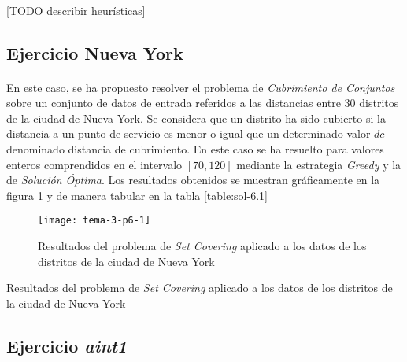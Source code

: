 \documentclass[spanish]{article}
\begin{document}
		\paragraph{}
		[TODO describir heurísticas]

		\subsection{Ejercicio Nueva York}
		\label{sec:e-6.1}

			\paragraph{}
			En este caso, se ha propuesto resolver el problema de \emph{Cubrimiento de Conjuntos} sobre un conjunto de datos de entrada referidos a las distancias entre $30$ distritos de la ciudad de Nueva York. Se considera que un distrito ha sido cubierto si la distancia a un punto de servicio es menor o igual que un determinado valor $dc$ denominado distancia de cubrimiento. En este caso se ha resuelto para valores enteros comprendidos en el intervalo $[70, 120]$ mediante la estrategia \emph{Greedy} y la de \emph{Solución Óptima}. Los resultados obtenidos se muestran gráficamente en la figura \ref{fig:sol-6.1} y de manera tabular en la tabla \ref{table:sol-6.1}


			\begin{figure}[h]
				\begin{center}
					\texttt{[image: tema-3-p6-1]}
				\end{center}
				\caption{Resultados del problema de \emph{Set Covering} aplicado a los datos de los distritos de la ciudad de Nueva York}
				\label{fig:sol-6.1}
			\end{figure}


			\begin{table}[h]
				\begin{center}
				\end{center}
				\caption{Resultados del problema de \emph{Set Covering} aplicado a los datos de los distritos de la ciudad de Nueva York}
				\label{table:sol-6.1}
			\end{table}

		\subsection{Ejercicio \emph{aint1}}
		\label{sec:e-6.2a}
\end{document}
